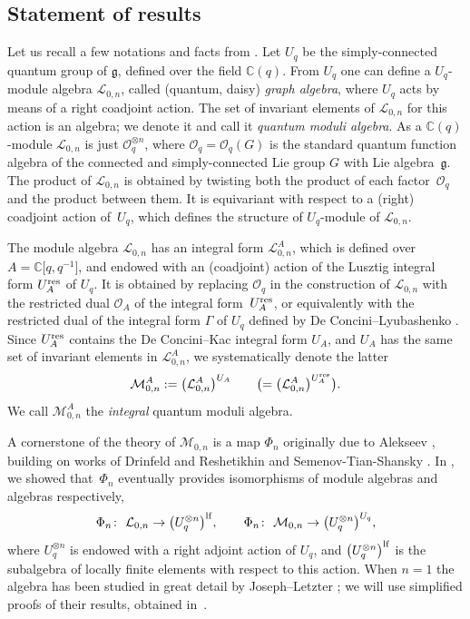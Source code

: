 \documentclass[pdftex]{sigma}
\numberwithin{equation}{section}
\theoremstyle{definition}
\newcommand{\mc}{\mathbb{C}}
\newcommand{\Ll}{{\mathcal L}}
\newcommand{\Mm}{{\mathcal M}}
\newcommand{\Oo}{{\mathcal O}}
\newcommand{\ra}{\rightarrow}
\begin{document}
\subsection{Statement of results}\label{statement} Let us recall a few notations and facts from \cite{BR}. Let $U_q$ be the simply-connected quantum group of $\mathfrak{g}$, defined over the field $\mc(q)$. From $U_q$ one can define a $U_q$-module algebra $\Ll_{0,n}$, called (quantum, daisy) {\it graph algebra}, where $U_q$ acts by means of a right coadjoint action. The set of invariant elements of $\Ll_{0,n}$ for this action is an algebra; we denote it \smash{$\Mm_{0,n}:=\Ll_{0,n}^{U_q}$} and call it {\it quantum moduli algebra}. As a $\mc(q)$-module $\Ll_{0,n}$ is just $\mathcal{O}_q^{\otimes n}$, where $\mathcal{O}_q = \mathcal{O}_q(G)$ is the standard quantum function algebra of the connected and simply-connected Lie group $G$ with Lie algebra~$\mathfrak{g}$. The product of $\Ll_{0,n}$ is obtained by twisting both the product of each factor~$\Oo_q$ and the product between them. It is equivariant with respect to a (right) coadjoint action of~$U_q$, which defines the structure of $U_q$-module of $\Ll_{0,n}$.

The module algebra $\Ll_{0,n}$ has an {integral form} $\Ll_{0,n}^A$, which is defined over $A=\mc\big[q,q^{-1}\big]$, and endowed with an (coadjoint) action of the Lusztig \cite{Lusztig2} integral form $U_A^{\rm res}$ of $U_q$. It is obtained by replacing $\mathcal{O}_q$ in the construction of $\Ll_{0,n}$ with the restricted dual $\mathcal{O}_A$ of the integral form~$U_A^{\rm res}$, or equivalently with the restricted dual of the integral form $\Gamma$ of $U_q$ defined by De Concini--Lyubashenko \cite{DC-L}. Since $U_A^{\rm res}$ contains the De Concini--Kac \cite{DC-K} integral form $U_A$, and $U_A$ has the same set of invariant elements in $\Ll_{0,n}^A$, we systematically denote the latter
\[\Mm_{0,n}^A := \big(\Ll_{0,n}^A\big)^{U_A} \qquad \bigl(=\big(\Ll_{0,n}^A\big)^{U_A^{\rm res}}\bigr).\]
We call $\Mm_{0,n}^A$ the {\it integral} quantum moduli algebra.

A cornerstone of the theory of $\Mm_{0,n}$ is a map $\Phi_n$ originally due to Alekseev \cite{A}, building on works of Drinfeld \cite{Dr} and Reshetikhin and Semenov-Tian-Shansky \cite{RSTS}. In \cite{BR}, we showed that~$\Phi_n$ eventually provides isomorphisms of module algebras and algebras respectively,
\[\Phi_n\colon\ \Ll_{0,n} \ra \big(U_q^{\otimes n}\big)^{\rm lf},\qquad \Phi_n\colon\ \Mm_{0,n} \ra \big(U_q^{\otimes n}\big)^{U_q},
\]
where $U_q^{\otimes n}$ is endowed with a right adjoint action of $U_q$, and $\big(U_q^{\otimes n}\big)^{\rm lf}$ is the subalgebra of locally finite elements with respect to this action. When $n=1$ the algebra  has been studied in great detail by Joseph--Letzter \cite{Jos,JL,JL2}; we will use simplified proofs of their results, obtained in~\cite{VY}.
\end{document}
